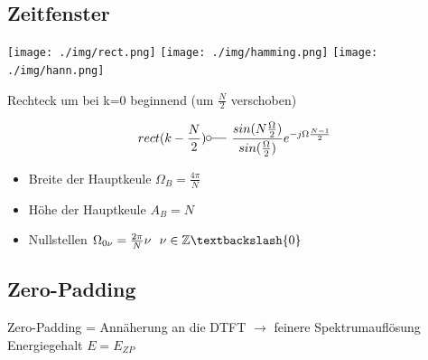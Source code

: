 \documentclass[10pt,a4paper]{article}
\begin{document}
\subsection{Zeitfenster}
  \begin{center}
      \texttt{[image: ./img/rect.png]}
      \texttt{[image: ./img/hamming.png]}
      \texttt{[image: ./img/hann.png]}
  \end{center}
  Rechteck um bei k=0 beginnend (um $\frac{N}{2}$ verschoben)
  \begin{mdframed}[style=exercise]
    \begin{align}
        rect(k-\frac{N}{2}) \fourier \frac{sin(N\frac{\Omega}{2})}{sin(\frac{\Omega}{2})} e^{-j\Omega\frac{N-1}{2}}
    \end{align}
  \end{mdframed}
  \begin{itemize}
    \item Breite der Hauptkeule $\Omega_B = \frac{4\pi}{N}$
    \item Höhe der Hauptkeule $A_B = N$
    \item Nullstellen $\Omega_{0\nu} = \frac{2\pi}{N}\nu \ \ \nu \in\mathbb{Z} \textbackslash\{0\}$
  \end{itemize}
\subsection{Zero-Padding}
Zero-Padding = Annäherung an die DTFT $\rightarrow$ feinere Spektrumauflösung Energiegehalt $E = E_{ZP}$ \\

\end{document}
